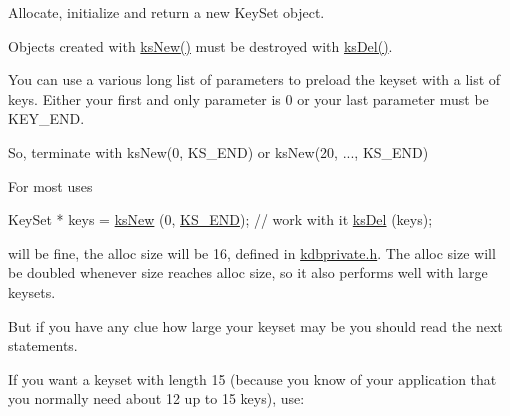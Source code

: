 Allocate, initialize and return a new Key\+Set object. 

Objects created with \hyperlink{group__keyset_ga671e1aaee3ae9dc13b4834a4ddbd2c3c}{ks\+New()} must be destroyed with \hyperlink{group__keyset_ga27e5c16473b02a422238c8d970db7ac8}{ks\+Del()}.

You can use a various long list of parameters to preload the keyset with a list of keys. Either your first and only parameter is 0 or your last parameter must be K\+E\+Y\+\_\+\+E\+ND.

So, terminate with ks\+New(0, K\+S\+\_\+\+E\+N\+D) or ks\+New(20, ..., K\+S\+\_\+\+E\+ND)

For most uses


\begin{DoxyCodeInclude}
KeySet * keys = \hyperlink{group__keyset_ga671e1aaee3ae9dc13b4834a4ddbd2c3c}{ksNew} (0, \hyperlink{kdbenum_8c_a7a28fce3773b2c873c94ac80b8b4cd54}{KS\_END});
\textcolor{comment}{// work with it}
\hyperlink{group__keyset_ga27e5c16473b02a422238c8d970db7ac8}{ksDel} (keys);
\end{DoxyCodeInclude}
 will be fine, the alloc size will be 16, defined in \hyperlink{kdbprivate_8h}{kdbprivate.\+h}. The alloc size will be doubled whenever size reaches alloc size, so it also performs well with large keysets.

But if you have any clue how large your keyset may be you should read the next statements.

If you want a keyset with length 15 (because you know of your application that you normally need about 12 up to 15 keys), use\+:


